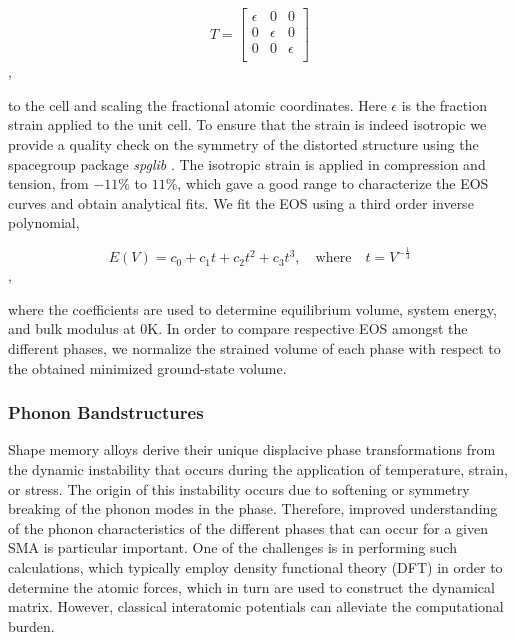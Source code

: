 \documentclass[preprint,colorlinks=true,linkcolor=black,citecolor=black]{elsarticle}
\begin{document}
\begin{equation}
  \label{eq:isotropic_strain}
  T=\begin{bmatrix}
    \epsilon & 0 & 0 \\
    0 & \epsilon & 0 \\
    0 & 0 & \epsilon \\
  \end{bmatrix}
\end{equation},

to the cell and scaling the fractional atomic coordinates. Here
$\epsilon$ is the fraction strain applied to the unit cell. To ensure
that the strain is indeed isotropic we provide a quality check on the
symmetry of the distorted structure using the spacegroup package
\textit{spglib} \cite{Togo2018}. The isotropic strain is applied in
compression and tension, from $-11\%$ to $11\%$, which gave a good
range to characterize the EOS curves and obtain analytical fits. We
fit the EOS using a third order inverse polynomial,

\begin{equation}
  \label{eq:eos_fit}
  E(V) = c_0 + c_1 t + c_2 t^2 + c_3 t^3, \quad \text{where} \quad t = V^{-\frac{1}{3}}
\end{equation},

where the coefficients are used to determine equilibrium volume,
system energy, and bulk modulus \cite{Alchagirov2003} at 0K. In order
to compare respective EOS amongst the different phases, we normalize
the strained volume of each phase with respect to the obtained
minimized ground-state volume. \par

\subsubsection{Phonon Bandstructures}

Shape memory alloys derive their unique displacive phase
transformations from the dynamic instability that occurs during the
application of temperature, strain, or stress. The origin of this
instability occurs due to softening or symmetry breaking of the phonon
modes in the phase. Therefore, improved understanding of the phonon
characteristics of the different phases that can occur for a given SMA
is particular important. One of the challenges is in performing such
calculations, which typically employ density functional theory (DFT)
in order to determine the atomic forces, which in turn are used to
construct the dynamical matrix. However, classical interatomic
potentials can alleviate the computational burden. \par
\end{document}
